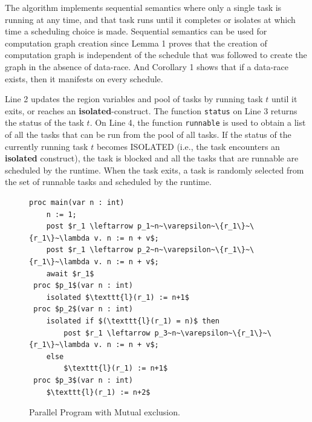 The algorithm implements sequential semantics where only a single task is running at any time, and that task runs until it completes or isolates at which time a scheduling choice is made. Sequential semantics can be used for computation graph creation since Lemma 1 proves that the creation of computation graph is independent of the schedule that was followed to create the graph in the absence of data-race. And Corollary 1 shows that if a data-race exists, then it manifests on every schedule. 

Line 2 updates the region variables and pool of tasks by running task $t$ until it exits, or reaches an \textbf{isolated}-construct. The function \texttt{status} on Line 3 returns the status of the task $t$. On Line 4, the function \texttt{runnable} is used to obtain a list of all the tasks that can be run from the pool of all tasks. If the status of the currently running task $t$ becomes ISOLATED (i.e., the task encounters an \textbf{isolated} construct), the task is blocked and all the tasks that are runnable are scheduled by the runtime. When the task exits, a task is randomly selected from the set of runnable tasks and scheduled by the runtime.

\begin{figure}
  \begin{center}
    \begin{lstlisting}[mathescape=true]
  proc main(var n : int)
  	n := 1;
  	post $r_1 \leftarrow p_1~n~\varepsilon~\{r_1\}~\{r_1\}~\lambda v. n := n + v$;
  	post $r_1 \leftarrow p_2~n~\varepsilon~\{r_1\}~\{r_1\}~\lambda v. n := n + v$;
  	await $r_1$
 proc $p_1$(var n : int)
 	isolated $\texttt{l}(r_1) := n+1$
 proc $p_2$(var n : int)
	isolated if $(\texttt{l}(r_1) = n)$ then
	  	post $r_1 \leftarrow p_3~n~\varepsilon~\{r_1\}~\{r_1\}~\lambda v. n := n + v$;
	else
		$\texttt{l}(r_1) := n+1$
 proc $p_3$(var n : int)
	$\texttt{l}(r_1) := n+2$
\end{lstlisting}
  \end{center}
    \vspace{-2em}
  \caption{Parallel Program with Mutual exclusion.}
  \label{fig:hj-isolated}
\end{figure}

